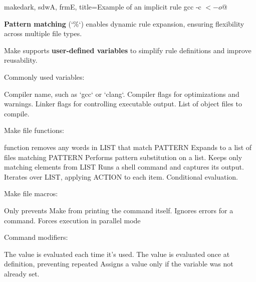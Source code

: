 \begin{NxCodeBox}{make}{dark, sdwA, frmE, title={Example of an implicit rule}}
		gcc -c $< -o $@
\end{NxCodeBox}

\bigskip

\begin{NxSSSSBox}[breakable]
	\begin{NxIDBox}
		\textbf{Pattern matching} (`\%`) enables dynamic rule expansion, ensuring flexibility across multiple file types.
	\end{NxIDBox}
\end{NxSSSSBox}

\begin{NxSSSSBox}
	\begin{NxIDBox}
		Make supports \textbf{user-defined variables} to simplify rule definitions and improve reusability.
	\end{NxIDBox}
	\begin{NxIDBox}
		Commonly used variables:
		\begin{NxListDark}
			 Compiler name, such as `gcc` or `clang`.
			 Compiler flags for optimizations and warnings.
			 Linker flags for controlling executable output.
			 List of object files to compile.
		\end{NxListDark}
	\end{NxIDBox}
	\begin{NxIDBox}
		Make file functions:
		\begin{NxListDark}
			 function removes any words in LIST that match PATTERN
			 Expands to a list of files matching PATTERN
			 Performs pattern substitution on a list.
			 Keeps only matching elements from LIST
			 Runs a shell command and captures its output.
			 Iterates over LIST, applying ACTION to each item.
			 Conditional evaluation.
		\end{NxListDark}
	\end{NxIDBox}
	\begin{NxIDBox}
		Make file macros:
		\begin{NxListDark}
			\nxIDSTopic{\nxAt} Only prevents Make from printing the command itself.
			\nxIDSTopic{\nxDash} Ignores errors for a command.
			\nxIDSTopic{\nxAdd} Forces execution in parallel mode
		\end{NxListDark}
	\end{NxIDBox}
	\begin{NxIDBox}
		Command modifiers:
		\begin{NxListDark}
			\nxIDSTopic{=} The value is evaluated each time it's used.
			\nxIDSTopic{:=} The value is evaluated once at definition, preventing repeated
			 Assigns a value only if the variable was not already set.
		\end{NxListDark}
	\end{NxIDBox}
\end{NxSSSSBox}

